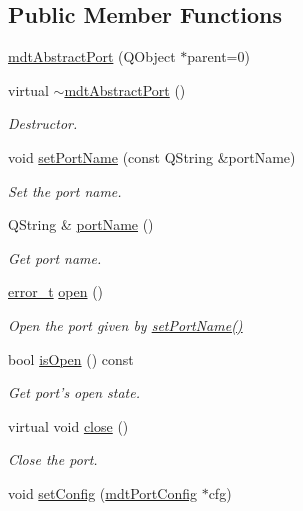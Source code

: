 \subsection*{Public Member Functions}
\begin{DoxyCompactItemize}
\item 
\hyperlink{classmdt_abstract_port_a35e7bff9413690833c832bf115da102f}{mdtAbstractPort} (QObject $\ast$parent=0)
\item 
virtual \hyperlink{classmdt_abstract_port_aa40baa0c593fef984f3796acafceee15}{$\sim$mdtAbstractPort} ()
\begin{DoxyCompactList}\small\item\em Destructor. \end{DoxyCompactList}\item 
void \hyperlink{classmdt_abstract_port_a0ca143d32fc677bac7c1cf0e04144932}{setPortName} (const QString \&portName)
\begin{DoxyCompactList}\small\item\em Set the port name. \end{DoxyCompactList}\item 
\hypertarget{classmdt_abstract_port_ac52fbd121f7cbb848a2f3e5d29fae615}{
QString \& \hyperlink{classmdt_abstract_port_ac52fbd121f7cbb848a2f3e5d29fae615}{portName} ()}
\label{classmdt_abstract_port_ac52fbd121f7cbb848a2f3e5d29fae615}

\begin{DoxyCompactList}\small\item\em Get port name. \end{DoxyCompactList}\item 
\hyperlink{classmdt_abstract_port_ad4121bb930c95887e77f8bafa065a85e}{error\_\-t} \hyperlink{classmdt_abstract_port_a4e0f0b7f9e24257677184e4bde10fdde}{open} ()
\begin{DoxyCompactList}\small\item\em Open the port given by \hyperlink{classmdt_abstract_port_a0ca143d32fc677bac7c1cf0e04144932}{setPortName()} \end{DoxyCompactList}\item 
\hypertarget{classmdt_abstract_port_a2122ae3141342ff38c8388e62b244e3b}{
bool \hyperlink{classmdt_abstract_port_a2122ae3141342ff38c8388e62b244e3b}{isOpen} () const }
\label{classmdt_abstract_port_a2122ae3141342ff38c8388e62b244e3b}

\begin{DoxyCompactList}\small\item\em Get port's open state. \end{DoxyCompactList}\item 
virtual void \hyperlink{classmdt_abstract_port_a1ace1a2bd1a04f16952980e247b04800}{close} ()
\begin{DoxyCompactList}\small\item\em Close the port. \end{DoxyCompactList}\item 
\hypertarget{classmdt_abstract_port_a48bdc0a8057c3b119763643098cf798f}{
void \hyperlink{classmdt_abstract_port_a48bdc0a8057c3b119763643098cf798f}{setConfig} (\hyperlink{classmdt_port_config}{mdtPortConfig} $\ast$cfg)}
\label{classmdt_abstract_port_a48bdc0a8057c3b119763643098cf798f}


\end{DoxyCompactItemize}
